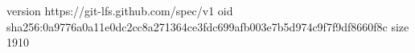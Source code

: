 version https://git-lfs.github.com/spec/v1
oid sha256:0a9776a0a11e0dc2cc8a271364ce3fdc699afb003e7b5d974c9f7f9df8660f8c
size 1910
